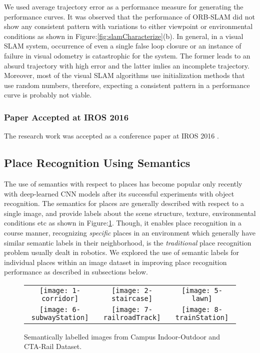\documentclass{article}
\begin{document}
We used average trajectory error as a performance measure for generating the performance curves. It was observed that the performance of ORB-SLAM did not show any consistent pattern with variations to either viewpoint or environmental conditions as shown in Figure:\ref{fig:slamCharacterize}(b). In general, in a visual SLAM system, occurrence of even a single false loop closure or an instance of failure in visual odometry is catastrophic for the system. The former leads to an absurd trajectory with high error and the latter imlies an incomplete trajectory. Moreover, most of the visual SLAM algorithms use initialization methods that use random numbers, therefore, expecting a consistent pattern in a performance curve is probably not viable.

\subsubsection{Paper Accepted at IROS 2016}
The research work was accepted as a conference paper at IROS 2016 \cite{skinner2016high}.

\subsection{Place Recognition Using Semantics}
The use of semantics with respect to places has become popular only recently with deep-learned CNN models after its successful experiments with object recognition. The semantics for places are generally described with respect to a single image, and provide labels about the scene structure, texture, environmental conditions etc as shown in Figure:\ref{fig:semLabels}. Though, it enables place recognition in a course manner, recognizing \emph{specific} places in an environment which generally have similar semantic labels in their neighborhood, is the \emph{traditional} place recognition problem usually dealt in robotics. We explored the use of semantic labels for individual places within an image dataset in improving place recognition performance as described in subsections below.

\begin{figure}
 \centering
 \begin{tabular}{ccc}
  \texttt{[image: 1-corridor]}&
  \texttt{[image: 2-staircase]}&
  \texttt{[image: 5-lawn]}\\
  \texttt{[image: 6-subwayStation]}&
  \texttt{[image: 7-railroadTrack]}&
  \texttt{[image: 8-trainStation]}\\
 \end{tabular}
\caption{Semantically labelled images from Campus Indoor-Outdoor and CTA-Rail Dataset.}
\label{fig:semLabels}
\end{figure}
\end{document}
